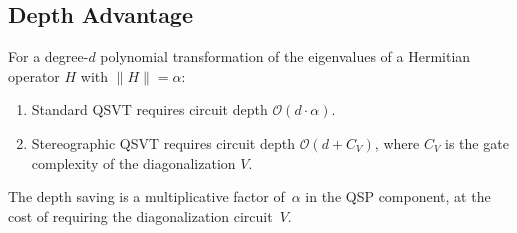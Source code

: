 \subsection{Depth Advantage}
\label{subsec:depth-advantage}

\begin{corollary}
	\label{cor:depth}
	For a degree-$d$ polynomial transformation of the
	eigenvalues of a Hermitian operator $H$ with
	$\|H\| = \alpha$:
	\begin{enumerate}
		\item Standard QSVT requires circuit depth
		      $\mathcal{O}(d \cdot \alpha)$.
		\item Stereographic QSVT requires circuit depth
		      $\mathcal{O}(d + C_V)$, where $C_V$ is the
		      gate complexity of the diagonalization $V$.
	\end{enumerate}
	The depth saving is a multiplicative factor of~$\alpha$
	in the QSP component, at the cost of requiring the
	diagonalization circuit~$V$.
\end{corollary}
